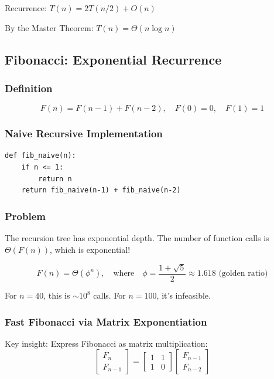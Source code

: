 \documentclass[11pt]{article}
\begin{document}
{Recurrence: $T(n) = 2T(n/2) + O(n)$

By the Master Theorem: $T(n) = \Theta(n \log n)$

\subsection*{Fibonacci: Exponential Recurrence}

\subsubsection*{Definition}
\[
F(n) = F(n-1) + F(n-2), \quad F(0) = 0, \quad F(1) = 1
\]

\subsubsection*{Naive Recursive Implementation}
\begin{lstlisting}
def fib_naive(n):
    if n <= 1:
        return n
    return fib_naive(n-1) + fib_naive(n-2)
\end{lstlisting}

\subsubsection*{Problem}
The recursion tree has exponential depth. The number of function calls is $\Theta(F(n))$, which is exponential!

\[
F(n) = \Theta(\phi^n), \quad \text{where} \quad \phi = \frac{1 + \sqrt{5}}{2} \approx 1.618 \text{ (golden ratio)}
\]

For $n=40$, this is $\sim 10^8$ calls. For $n=100$, it's infeasible.

\subsubsection*{Fast Fibonacci via Matrix Exponentiation}

Key insight: Express Fibonacci as matrix multiplication:
\[
\begin{bmatrix} F_n \\ F_{n-1} \end{bmatrix} = \begin{bmatrix} 1 & 1 \\ 1 & 0 \end{bmatrix} \begin{bmatrix} F_{n-1} \\ F_{n-2} \end{bmatrix}
\]

}
\end{document}
